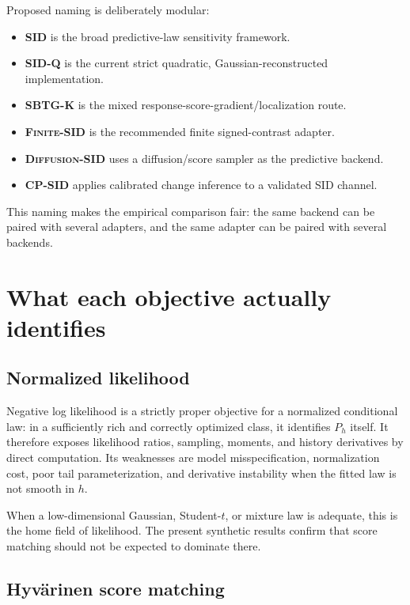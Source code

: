 \documentclass[10pt]{article}
\newcommand{\SIDQ}{\textnormal{\textsc{SID-Q}}\xspace}
\newcommand{\FiniteSID}{\textnormal{\textsc{Finite-SID}}\xspace}
\newcommand{\DiffSID}{\textnormal{\textsc{Diffusion-SID}}\xspace}
\newcommand{\SBTGK}{\textnormal{\textsc{SBTG-K}}\xspace}
\newcommand{\CPSID}{\textnormal{\textsc{CP-SID}}\xspace}
\begin{document}
Proposed naming is deliberately modular:

\begin{itemize}
  \item \textbf{SID} is the broad predictive-law sensitivity framework.
  \item \textbf{\SIDQ} is the current strict quadratic, Gaussian-reconstructed implementation.
  \item \textbf{\SBTGK} is the mixed response-score-gradient/localization route.
  \item \textbf{\FiniteSID} is the recommended finite signed-contrast adapter.
  \item \textbf{\DiffSID} uses a diffusion/score sampler as the predictive backend.
  \item \textbf{\CPSID} applies calibrated change inference to a validated SID channel.
\end{itemize}

This naming makes the empirical comparison fair: the same backend can be paired with several adapters, and the same adapter can be paired with several backends.

\section{What each objective actually identifies}

\subsection{Normalized likelihood}

Negative log likelihood is a strictly proper objective for a normalized conditional law: in a sufficiently rich and correctly optimized class, it identifies \(P_h\) itself. It therefore exposes likelihood ratios, sampling, moments, and history derivatives by direct computation. Its weaknesses are model misspecification, normalization cost, poor tail parameterization, and derivative instability when the fitted law is not smooth in \(h\).

When a low-dimensional Gaussian, Student-\(t\), or mixture law is adequate, this is the home field of likelihood. The present synthetic results confirm that score matching should not be expected to dominate there.

\subsection{Hyv\"arinen score matching}
\end{document}
